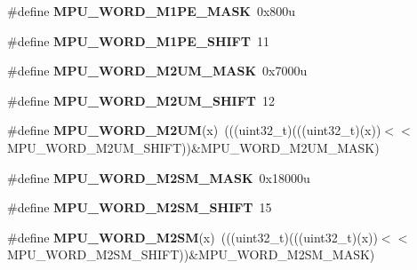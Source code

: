 \begin{DoxyCompactItemize}
\item 
\#define {\bfseries M\+P\+U\+\_\+\+W\+O\+R\+D\+\_\+\+M1\+P\+E\+\_\+\+M\+A\+SK}~0x800u\hypertarget{group__MPU__Register__Masks_ga94b4a665c530cd24d0c50f3f2492fe76}{}\label{group__MPU__Register__Masks_ga94b4a665c530cd24d0c50f3f2492fe76}

\item 
\#define {\bfseries M\+P\+U\+\_\+\+W\+O\+R\+D\+\_\+\+M1\+P\+E\+\_\+\+S\+H\+I\+FT}~11\hypertarget{group__MPU__Register__Masks_ga55fd259e384eb99bec87cf114513e009}{}\label{group__MPU__Register__Masks_ga55fd259e384eb99bec87cf114513e009}

\item 
\#define {\bfseries M\+P\+U\+\_\+\+W\+O\+R\+D\+\_\+\+M2\+U\+M\+\_\+\+M\+A\+SK}~0x7000u\hypertarget{group__MPU__Register__Masks_ga8ac2b629f0deac03fa994c2159e8714c}{}\label{group__MPU__Register__Masks_ga8ac2b629f0deac03fa994c2159e8714c}

\item 
\#define {\bfseries M\+P\+U\+\_\+\+W\+O\+R\+D\+\_\+\+M2\+U\+M\+\_\+\+S\+H\+I\+FT}~12\hypertarget{group__MPU__Register__Masks_gab0b3fbb6bf7c3bf27b3e26ed22015a9a}{}\label{group__MPU__Register__Masks_gab0b3fbb6bf7c3bf27b3e26ed22015a9a}

\item 
\#define {\bfseries M\+P\+U\+\_\+\+W\+O\+R\+D\+\_\+\+M2\+UM}(x)~(((uint32\+\_\+t)(((uint32\+\_\+t)(x))$<$$<$M\+P\+U\+\_\+\+W\+O\+R\+D\+\_\+\+M2\+U\+M\+\_\+\+S\+H\+I\+FT))\&M\+P\+U\+\_\+\+W\+O\+R\+D\+\_\+\+M2\+U\+M\+\_\+\+M\+A\+SK)\hypertarget{group__MPU__Register__Masks_ga34033b073766daac47fd2e1ba5af32c5}{}\label{group__MPU__Register__Masks_ga34033b073766daac47fd2e1ba5af32c5}

\item 
\#define {\bfseries M\+P\+U\+\_\+\+W\+O\+R\+D\+\_\+\+M2\+S\+M\+\_\+\+M\+A\+SK}~0x18000u\hypertarget{group__MPU__Register__Masks_ga1fd18149f5a26686b45d9bbc90de70e0}{}\label{group__MPU__Register__Masks_ga1fd18149f5a26686b45d9bbc90de70e0}

\item 
\#define {\bfseries M\+P\+U\+\_\+\+W\+O\+R\+D\+\_\+\+M2\+S\+M\+\_\+\+S\+H\+I\+FT}~15\hypertarget{group__MPU__Register__Masks_ga0e28cfb776dbafafa4c04e094872ecc9}{}\label{group__MPU__Register__Masks_ga0e28cfb776dbafafa4c04e094872ecc9}

\item 
\#define {\bfseries M\+P\+U\+\_\+\+W\+O\+R\+D\+\_\+\+M2\+SM}(x)~(((uint32\+\_\+t)(((uint32\+\_\+t)(x))$<$$<$M\+P\+U\+\_\+\+W\+O\+R\+D\+\_\+\+M2\+S\+M\+\_\+\+S\+H\+I\+FT))\&M\+P\+U\+\_\+\+W\+O\+R\+D\+\_\+\+M2\+S\+M\+\_\+\+M\+A\+SK)\hypertarget{group__MPU__Register__Masks_ga5d8c065051a43f8f18af7133f77bcccc}{}\label{group__MPU__Register__Masks_ga5d8c065051a43f8f18af7133f77bcccc}


\end{DoxyCompactItemize}
